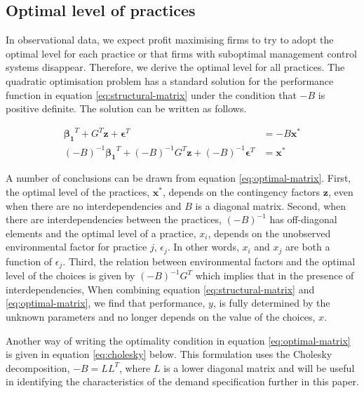 \documentclass[12pt]{article}
\begin{document}
\subsection{Optimal level of practices}\label{optimal-practices}

In observational data, we expect profit maximising firms to try to adopt the optimal level for each practice or that firms with suboptimal management control systems disappear. Therefore, we derive the optimal level for all practices. The quadratic optimisation problem has a standard solution for the performance function in equation \eqref{eq:structural-matrix} under the condition that $-B$ is positive definite. The solution can be written as follows.

\begin{equation} \label{eq:optimal-matrix}
\begin{aligned} 
    \mathbf{\beta_1}^T + G^T \mathbf{z} + \mathbf{\epsilon}^T & = -B \mathbf{x^*} \\
    (-B)^{-1} \mathbf{\beta_1}^T + (-B)^{-1} G^T \mathbf{z} + (-B)^{-1} \mathbf{\epsilon}^T & = \mathbf{x^*}
\end{aligned}
\end{equation}

A number of conclusions can be drawn from equation \eqref{eq:optimal-matrix}. First, the optimal level of the practices, $\mathbf{x^*}$, depends on the contingency factors $\mathbf{z}$, even when there are no interdependencies and $B$ is a diagonal matrix. Second, when there are interdependencies between the practices, $(-B)^{-1}$ has off-diagonal elements and the optimal level of a practice, $x_i$, depends on the unobserved environmental factor for practice $j$, $\epsilon_j$. In other words, $x_i$ and $x_j$ are both a function of $\epsilon_j$. Third, the relation between environmental factors and the optimal level of the choices is given by $(-B)^{-1} G^T$ which implies that in the presence of interdependencies, When combining equation \eqref{eq:structural-matrix} and \eqref{eq:optimal-matrix}, we find that performance, $y$, is fully determined by the unknown parameters and no longer depends on the value of the choices, $x$. 

Another way of writing the optimality condition in equation \eqref{eq:optimal-matrix} is given in equation \eqref{eq:cholesky} below. This formulation uses the Cholesky decomposition, $-B = LL^T$, where $L$ is a lower diagonal matrix and will be useful in identifying the characteristics of the demand specification further in this paper.
\end{document}
